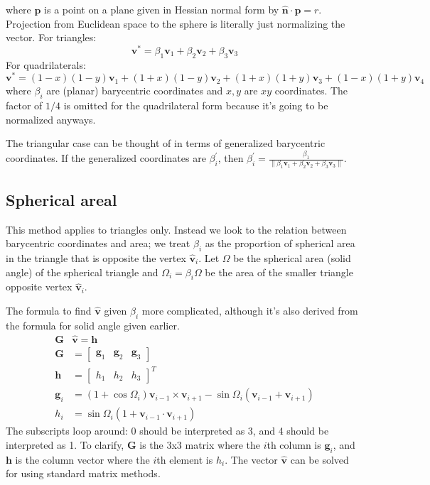\documentclass{amsart}[12pt]
\begin{document}
where $\mathbf p$ is a point on a plane given in Hessian normal
form by $\hat{\mathbf n} \cdot \mathbf p = r$. Projection from Euclidean
space to the sphere is literally just normalizing the vector. For triangles:
\begin{equation}
   \mathbf v^* =
   \beta_1 \mathbf v_1 + \beta_2 \mathbf v_2 + \beta_3 \mathbf v_3
\end{equation}
For quadrilaterals:
\begin{equation}
   \mathbf v^* = (1-x)(1-y) \mathbf v_1 +
   (1+x)(1-y) \mathbf v_2 +
   (1+x)(1+y) \mathbf v_3 +
   (1-x)(1+y) \mathbf v_4
 \end{equation}
where $\beta_i$ are (planar) barycentric coordinates and $x,y$ are
$xy$ coordinates. The factor of $1/4$ is omitted for the quadrilateral
form because it's going to be normalized anyways.

The triangular case can be thought of in terms of generalized
barycentric coordinates. If the generalized coordinates are
$\beta^\prime_i$, then $\beta^\prime_i = \frac{\beta_1}
{\|\beta_1 \mathbf v_1 + \beta_2 \mathbf v_2 + \beta_3 \mathbf v_3\|}$.

\subsection{Spherical areal}
This method applies to triangles only. Instead we look to the relation between
barycentric coordinates and area; we treat $\beta_i$ as the proportion of
spherical area in the triangle that is opposite the vertex $\hat{\mathbf v}_i$.
Let $\Omega$ be the spherical area (solid angle) of the spherical triangle and
$\Omega_i = \beta_i\Omega$ be the area of the smaller triangle opposite vertex
$\hat{\mathbf v}_i$.

The formula to find $\hat{\mathbf v}$ given $\beta_i$ more complicated,
although it's also derived from the formula for solid angle given earlier.
\begin{equation}
\label{eq:sphareal}
  \begin{split}
  \mathbf G & \hat{\mathbf v} = \mathbf h \\
   \mathbf G & = \begin{bmatrix}
   \mathbf g_1 & \mathbf g_2 & \mathbf g_3 \end{bmatrix} \\
   \mathbf h & = \begin{bmatrix} h_1  & h_2 & h_3  \end{bmatrix}^T \\
   \mathbf g_{i} & = \left(1+\cos \Omega_{i}\right) \mathbf v_{i-1} \times
   \mathbf v_{i+1} - \sin\Omega_{i}\left(\mathbf v_{i-1} +
   \mathbf v_{i+1}\right)\\
   h_i &= \sin\Omega_i\left(1+\mathbf v_{i-1}\cdot\mathbf v_{i+1}\right)
\end{split}\end{equation}
The subscripts loop around: 0 should be interpreted as 3, and 4 should be
interpreted as 1. To clarify, $\mathbf G$ is the 3x3 matrix where the $i$th
column is $\mathbf g_i$, and $\mathbf h$ is the column vector where the
$i$th element is $h_i$. The vector $\hat{\mathbf v}$
can be solved for using standard matrix methods.
\end{document}
